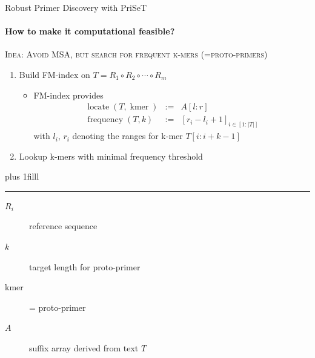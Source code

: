 \documentclass[xcolor=dvipsnames,envcountsect]{beamer}
\newcommand{\flushdown}{\vskip0pt plus 1filll}
\begin{document}
\begin{frame}{Robust Primer Discovery with PriSeT \cite{PriSeT}}
\framesubtitle{How to make it computational feasible?}
\begin{block}
	\scshape
Idea: Avoid MSA, but search for frequent k-mers (=proto-primers)
\end{block}
    \begin{enumerate}
        \item Build FM-index \cite{Ferragina2005} on $T = R_1 \circ  R_2 \circ \cdots \circ R_m$  %
        \begin{itemize}
            \item FM-index provides
            \begin{eqnarray*}
            \operatorname{locate} (T, \operatorname{kmer}) &:=& A[l:r]\\
            \operatorname{frequency} (T, k) &:=& [r_i - l_i + 1]_{i\in [1:|T|]}
            \end{eqnarray*}
            with $l_i$, $r_i$ denoting the ranges for k-mer $T[i:i+k-1]$
        \end{itemize}
        \item Lookup k-mers with minimal frequency threshold %
    \end{enumerate}
\flushdown
\rule{\textwidth}{.8pt} 
{\footnotesize
\begin{description}
    \item[$R_i$] reference sequence
    \item[$k$] target length for proto-primer
    \item[kmer] = proto-primer
    \item[$A$] suffix array derived from text $T$ 
\end{description}
}
\end{frame}
\end{document}
